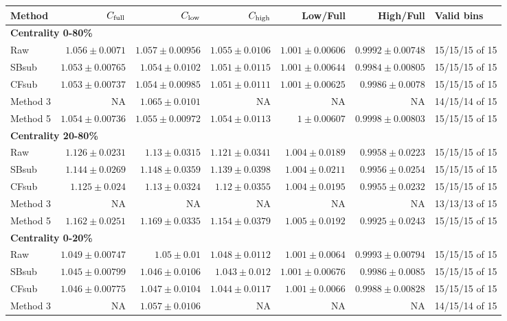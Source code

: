 \documentclass[10pt,a4paper]{article}
\begin{document}
{\scriptsize\setlength{\tabcolsep}{3pt}\begin{longtable}{lrrrrrl}
\hline Method & $C_{\rm full}$ & $C_{\rm low}$ & $C_{\rm high}$ & Low/Full & High/Full & Valid bins\\\hline\endhead
\multicolumn{7}{l}{\textbf{Centrality 0-80\%}}\\
Raw & $1.056\pm0.0071$ & $1.057\pm0.00956$ & $1.055\pm0.0106$ & $1.001\pm0.00606$ & $0.9992\pm0.00748$ & 15/15/15 of 15\\
SBsub & $1.053\pm0.00765$ & $1.054\pm0.0102$ & $1.051\pm0.0115$ & $1.001\pm0.00644$ & $0.9984\pm0.00805$ & 15/15/15 of 15\\
CFsub & $1.053\pm0.00737$ & $1.054\pm0.00985$ & $1.051\pm0.0111$ & $1.001\pm0.00625$ & $0.9986\pm0.0078$ & 15/15/15 of 15\\
Method 3 & NA & $1.065\pm0.0101$ & NA & NA & NA & 14/15/14 of 15\\
Method 5 & $1.054\pm0.00736$ & $1.055\pm0.00972$ & $1.054\pm0.0113$ & $1\pm0.00607$ & $0.9998\pm0.00803$ & 15/15/15 of 15\\
\hline
\multicolumn{7}{l}{\textbf{Centrality 20-80\%}}\\
Raw & $1.126\pm0.0231$ & $1.13\pm0.0315$ & $1.121\pm0.0341$ & $1.004\pm0.0189$ & $0.9958\pm0.0223$ & 15/15/15 of 15\\
SBsub & $1.144\pm0.0269$ & $1.148\pm0.0359$ & $1.139\pm0.0398$ & $1.004\pm0.0211$ & $0.9956\pm0.0254$ & 15/15/15 of 15\\
CFsub & $1.125\pm0.024$ & $1.13\pm0.0324$ & $1.12\pm0.0355$ & $1.004\pm0.0195$ & $0.9955\pm0.0232$ & 15/15/15 of 15\\
Method 3 & NA & NA & NA & NA & NA & 13/13/13 of 15\\
Method 5 & $1.162\pm0.0251$ & $1.169\pm0.0335$ & $1.154\pm0.0379$ & $1.005\pm0.0192$ & $0.9925\pm0.0243$ & 15/15/15 of 15\\
\hline
\multicolumn{7}{l}{\textbf{Centrality 0-20\%}}\\
Raw & $1.049\pm0.00747$ & $1.05\pm0.01$ & $1.048\pm0.0112$ & $1.001\pm0.0064$ & $0.9993\pm0.00794$ & 15/15/15 of 15\\
SBsub & $1.045\pm0.00799$ & $1.046\pm0.0106$ & $1.043\pm0.012$ & $1.001\pm0.00676$ & $0.9986\pm0.0085$ & 15/15/15 of 15\\
CFsub & $1.046\pm0.00775$ & $1.047\pm0.0104$ & $1.044\pm0.0117$ & $1.001\pm0.0066$ & $0.9988\pm0.00828$ & 15/15/15 of 15\\
Method 3 & NA & $1.057\pm0.0106$ & NA & NA & NA & 14/15/14 of 15\\

\end{longtable}}
\end{document}
